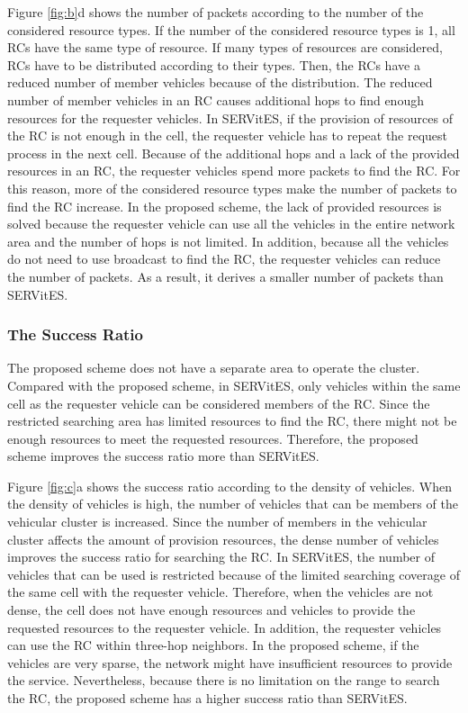 \documentclass[sensors,article,accept,moreauthors,pdftex]{Definitions/mdpi}
\begin{document}
Figure \ref{fig:b}d shows the number of packets according to the number of the considered resource types.
If the number of the considered resource types is 1, all RCs have the same type of resource.
If many types of resources are considered, RCs have to be distributed according to their types.
Then, the RCs have a reduced number of member vehicles because of the distribution.
The reduced number of member vehicles in an RC causes additional hops to find enough resources for the requester vehicles.
In SERVitES, if the provision of resources of the RC is not enough in the cell, the requester vehicle has to repeat the request process in the next cell.
Because of the additional hops and a lack of the provided resources in an RC, the requester vehicles spend more packets to find the RC.
For this reason, more of the considered resource types make the number of packets to find the RC increase.
In the proposed scheme, the lack of provided resources is solved because the requester vehicle can use all the vehicles in the entire network area and the number of hops is not limited.
In addition, because all the vehicles do not need to use broadcast to find the RC, the requester vehicles can reduce the number of packets.
As a result, it derives a smaller number of packets than SERVitES.



\subsubsection{The Success Ratio}
The proposed scheme does not have a separate area to operate the cluster.
Compared with the proposed scheme, in SERVitES, only vehicles within the same cell as the requester vehicle can be considered members of the RC.
Since the restricted searching area has limited resources to find the RC, there might not be enough resources to meet the requested resources.
Therefore, the proposed scheme improves the success ratio more than SERVitES.

Figure \ref{fig:c}a shows the success ratio according to the density of vehicles.
When the density of vehicles is high, the number of vehicles that can be members of the vehicular cluster is increased.
Since the number of members in the vehicular cluster affects the amount of provision resources, the dense number of vehicles improves the success ratio for searching the RC.
In SERVitES, the number of vehicles that can be used is restricted because of the limited searching coverage of the same cell with the requester vehicle.
Therefore, when the vehicles are not dense, the cell does not have enough resources and vehicles to provide the requested resources to the requester vehicle.
In addition, the requester vehicles can use the RC within three-hop neighbors.
In the proposed scheme, if the vehicles are very sparse, the network might have insufficient resources to provide the service.
Nevertheless, because there is no limitation on the range to search the RC, the proposed scheme has a higher success ratio than SERVitES.
\end{document}
